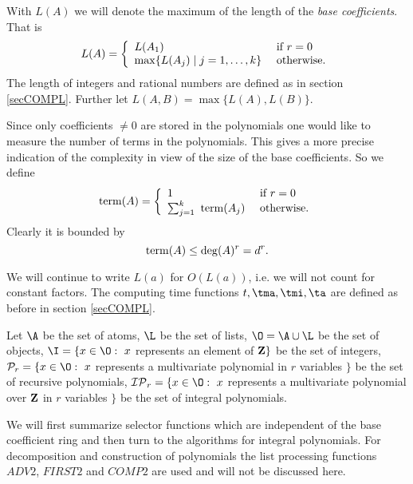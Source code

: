 With $L(A)$ we will denote the 
maximum of the length of the {\em base coefficients}.
That is  
$$
  L(A) = \left\{
         \begin{array}{ll}
                L(A_1) & \mbox{\rm \ if\ } r = 0 \\
                \max \{ L (A_j) \mid j=1, \ldots, k \} & 
                        \mbox{\rm \ otherwise}. 
         \end{array}
         \right.
$$
The length of integers and rational numbers are defined as in
section \ref{secCOMPL}.
Further let $L(A,B) = \max \{ L(A), L(B) \}$. 

Since only coefficients $\neq 0$ are stored in the polynomials
one would like to measure the number of terms in the polynomials.
This gives a more precise indication of the 
complexity in view of the size of the base coefficients. 
So we define 
$$
  {\rm term}(A) = \left\{
         \begin{array}{ll}
                1 & \mbox{\rm \ if\ } r = 0 \\
                \sum_{j=1}^{k} \ {\rm term}(A_j) & 
                        \mbox{\rm \ otherwise}. 
         \end{array}
         \right.
$$
Clearly it is bounded by 
$${\rm term}(A) \leq \deg(A)^r = d^r.$$

We will continue to write $L(a)$ for $O(L(a))$, 
i.e. we will not count for constant factors.
The computing time functions $t, \tma, \tmi, \ta$ 
are defined as before in section \ref{secCOMPL}.

\def\IP{{\cal IP}}
\def\Po{{\cal P}}
Let
$\A$ be the set of atoms,
$\L$ be the set of lists,
$\O = \A \cup \L$ be the set of objects,
$\I = \{ x \in \O: \ x$ represents an element of ${\rm \bf Z} \}$ 
be the set of integers, 
$\Po_r = \{ x \in \O: \ x$ represents a multivariate polynomial 
           in $r$ variables $\}$ 
be the set of recursive polynomials,
$\IP_r = \{ x \in \O: \ x$ represents a multivariate polynomial over
           ${\rm \bf Z}$ in $r$ variables $\}$ 
be the set of integral polynomials. 

We will first summarize selector functions which are 
independent of the base coefficient ring
and then turn to the algorithms for integral polynomials.
For decomposition and construction of polynomials  
the list processing functions $ADV2$, $FIRST2$ and $COMP2$ 
are used and will not be discussed here.

